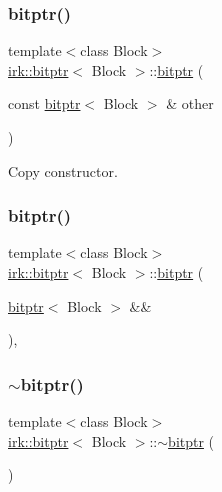 \subsubsection{\texorpdfstring{bitptr()}{bitptr()}\hspace{0.1cm}{\footnotesize\ttfamily [2/3]}}
{\footnotesize\ttfamily template$<$class Block$>$ \\
\mbox{\hyperlink{classirk_1_1bitptr}{irk\+::bitptr}}$<$ Block $>$\+::\mbox{\hyperlink{classirk_1_1bitptr}{bitptr}} (\begin{DoxyParamCaption}\item[{const \mbox{\hyperlink{classirk_1_1bitptr}{bitptr}}$<$ Block $>$ \&}]{other }\end{DoxyParamCaption})\hspace{0.3cm}{\ttfamily [inline]}}



Copy constructor. 

\mbox{\label{classirk_1_1bitptr_a731008f6aafd2f7c2cc94f61adfa4b0a}} 
\subsubsection{\texorpdfstring{bitptr()}{bitptr()}\hspace{0.1cm}{\footnotesize\ttfamily [3/3]}}
{\footnotesize\ttfamily template$<$class Block$>$ \\
\mbox{\hyperlink{classirk_1_1bitptr}{irk\+::bitptr}}$<$ Block $>$\+::\mbox{\hyperlink{classirk_1_1bitptr}{bitptr}} (\begin{DoxyParamCaption}\item[{\mbox{\hyperlink{classirk_1_1bitptr}{bitptr}}$<$ Block $>$ \&\&}]{ }\end{DoxyParamCaption})\hspace{0.3cm}{\ttfamily [default]}, {\ttfamily [noexcept]}}

\mbox{\label{classirk_1_1bitptr_aea23dcd9c00281ff5442d52c506afd1a}} 
\subsubsection{\texorpdfstring{$\sim$bitptr()}{~bitptr()}}
{\footnotesize\ttfamily template$<$class Block$>$ \\
\mbox{\hyperlink{classirk_1_1bitptr}{irk\+::bitptr}}$<$ Block $>$\+::$\sim$\mbox{\hyperlink{classirk_1_1bitptr}{bitptr}} (\begin{DoxyParamCaption}{ }\end{DoxyParamCaption})\hspace{0.3cm}{\ttfamily [default]}}



